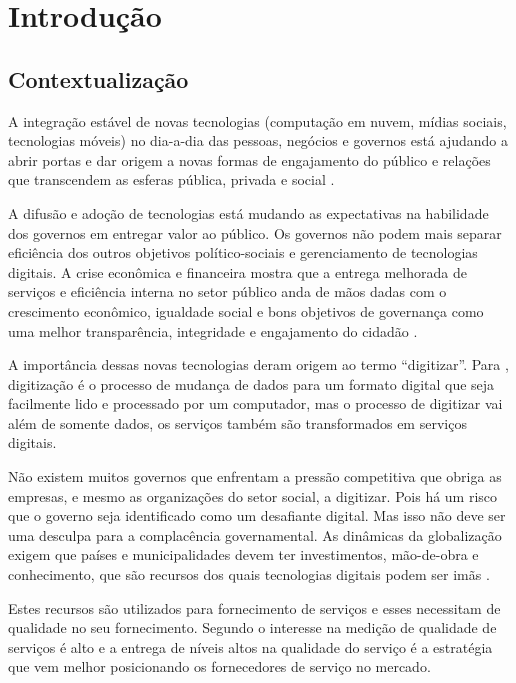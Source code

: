 \chapter[Introdução]{Introdução}
\section{Contextualização}
A integração estável de novas tecnologias (computação em nuvem, mídias sociais, tecnologias móveis) no dia-a-dia das pessoas, negócios e governos está ajudando a abrir portas e dar origem a novas formas de engajamento do público  e relações que transcendem as esferas pública, privada e social \cite{oecd2014}.

A difusão e adoção de tecnologias está mudando as expectativas na habilidade dos governos em entregar valor ao público. Os governos não podem mais separar eficiência dos outros objetivos político-sociais e gerenciamento de tecnologias digitais. A crise econômica e financeira mostra que a entrega melhorada de serviços e eficiência interna no setor público anda de mãos dadas com o crescimento econômico, igualdade social e bons objetivos de governança como uma melhor transparência, integridade e engajamento do cidadão \cite{oecd2014}.

A importância dessas novas tecnologias deram origem ao termo “digitizar”. Para \cite{steven2015}, digitização é o processo de mudança de dados para um formato digital que seja facilmente lido e processado por um computador, mas o processo de digitizar vai além de somente dados, os serviços também são transformados em serviços digitais.

Não existem muitos governos que enfrentam a pressão competitiva que obriga as empresas, e mesmo as organizações do setor social, a digitizar. Pois há um risco que o governo seja identificado como um desafiante digital. Mas isso não deve ser uma desculpa para a complacência governamental. As dinâmicas da globalização exigem que países e municipalidades devem ter investimentos, mão-de-obra e conhecimento, que são recursos dos quais tecnologias digitais podem ser imãs \cite{mckinsey2016}.

Estes recursos são utilizados para fornecimento de serviços e esses necessitam de qualidade no seu fornecimento. Segundo \cite{cronintaylor1992} o interesse na medição de qualidade de serviços é alto e a entrega de níveis altos na qualidade do serviço é a estratégia que vem melhor posicionando os fornecedores de serviço no mercado. 

